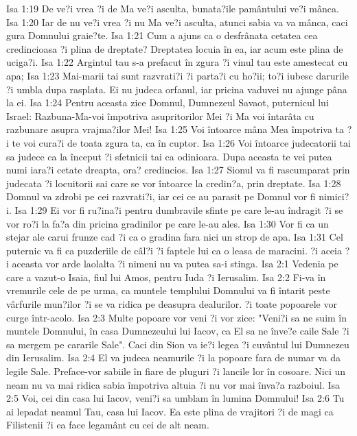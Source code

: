 Isa 1:19  De ve?i vrea ?i de Ma ve?i asculta, bunata?ile pamântului ve?i mânca.
Isa 1:20  Iar de nu ve?i vrea ?i nu Ma ve?i asculta, atunci sabia va va mânca, caci gura Domnului graie?te.
Isa 1:21  Cum a ajuns ca o desfrânata cetatea cea credincioasa ?i plina de dreptate? Dreptatea locuia în ea, iar acum este plina de uciga?i.
Isa 1:22  Argintul tau s-a prefacut în zgura ?i vinul tau este amestecat cu apa;
Isa 1:23  Mai-marii tai sunt razvrati?i ?i parta?i cu ho?ii; to?i iubesc darurile ?i umbla dupa rasplata. Ei nu judeca orfanul, iar pricina vaduvei nu ajunge pâna la ei.
Isa 1:24  Pentru aceasta zice Domnul, Dumnezeul Savaot, puternicul lui Israel: Razbuna-Ma-voi împotriva asupritorilor Mei ?i Ma voi întarâta cu razbunare asupra vrajma?ilor Mei!
Isa 1:25  Voi întoarce mâna Mea împotriva ta ?i te voi cura?i de toata zgura ta, ca în cuptor.
Isa 1:26  Voi întoarce judecatorii tai sa judece ca la început ?i sfetnicii tai ca odinioara. Dupa aceasta te vei putea numi iara?i cetate dreapta, ora? credincios.
Isa 1:27  Sionul va fi rascumparat prin judecata ?i locuitorii sai care se vor întoarce la credin?a, prin dreptate.
Isa 1:28  Domnul va zdrobi pe cei razvrati?i, iar cei ce au parasit pe Domnul vor fi nimici?i.
Isa 1:29  Ei vor fi ru?ina?i pentru dumbravile sfinte pe care le-au îndragit ?i se vor ro?i la fa?a din pricina gradinilor pe care le-au ales.
Isa 1:30  Vor fi ca un stejar ale carui frunze cad ?i ca o gradina fara nici un strop de apa.
Isa 1:31  Cel puternic va fi ca puzderiile de câl?i ?i faptele lui ca o leasa de maracini. ?i aceia ?i aceasta vor arde laolalta ?i nimeni nu va putea sa-i stinga.
Isa 2:1  Vedenia pe care a vazut-o Isaia, fiul lui Amos, pentru Iuda ?i Ierusalim.
Isa 2:2  Fi-va în vremurile cele de pe urma, ca muntele templului Domnului va fi întarit peste vârfurile mun?ilor ?i se va ridica pe deasupra dealurilor. ?i toate popoarele vor curge într-acolo.
Isa 2:3  Multe popoare vor veni ?i vor zice: "Veni?i sa ne suim în muntele Domnului, în casa Dumnezeului lui Iacov, ca El sa ne înve?e caile Sale ?i sa mergem pe cararile Sale". Caci din Sion va ie?i legea ?i cuvântul lui Dumnezeu din Ierusalim.
Isa 2:4  El va judeca neamurile ?i la popoare fara de numar va da legile Sale. Preface-vor sabiile în fiare de pluguri ?i lancile lor în cosoare. Nici un neam nu va mai ridica sabia împotriva altuia ?i nu vor mai înva?a razboiul.
Isa 2:5  Voi, cei din casa lui Iacov, veni?i sa umblam în lumina Domnului!
Isa 2:6  Tu ai lepadat neamul Tau, casa lui Iacov. Ea este plina de vrajitori ?i de magi ca Filistenii ?i ea face legamânt cu cei de alt neam.
